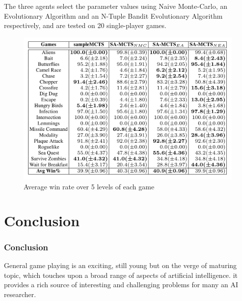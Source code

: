 \documentclass{beamer}
\begin{document}
\begin{frame}[allowframebreaks]
The three agents select the parameter values using Naive Monte-Carlo, an Evolutionary Algorithm and an N-Tuple Bandit Evolutionary Algorithm respectively, and are tested on 20 single-player games.

\begin{figure}[c]
  \includegraphics[width=1\linewidth]{figures/figure1}
  \caption{ Average win rate over 5 levels of each game}
\end{figure}
\end{frame}

\section{Conclusion}
\begin{frame}
  \frametitle{Conclusion}
  General game playing is an exciting, still young but on the verge of maturing topic, which touches upon a broad range of aspects of artificial intelligence. it provides a rich source of interesting and challenging problems for many an AI researcher.
  

\end{frame}
\end{document}
